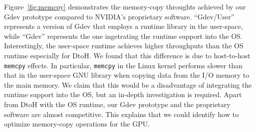 Figure~\ref{fig:memcpy} demonstrates the memory-copy throughts achieved
by our Gdev prototype compared to NVIDIA's proprietary software.
``Gdev/User'' represents a version of Gdev that employs a runtime
library in the user-space, while ``Gdev'' represents the one ingetrating
the runtime support into the OS.
Interestingly, the user-space runtime achieves higher throughputs than
the OS runtime especially for DtoH.
We found that this difference is due to host-to-host \texttt{memcpy}
effects.
In particular, \texttt{memcpy} in the Linux kernel performs slower than
that in the user-space GNU library when copying data from the I/O memory
to the main memory.
We claim that this would be a disadvantage of integrating the runtime
support into the OS, but an in-depth investigation is required.
Apart from DtoH with the OS runtime, our Gdev prototype and the
proprietary software are almost competitive.
This explains that we could identify how to optimize memory-copy
operations for the GPU.
 
